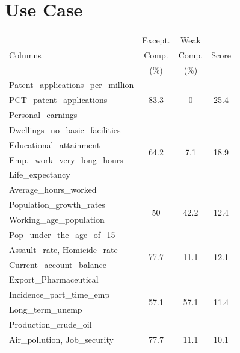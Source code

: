 \section{Use Case}
\label{sec:usecase}

\begin{table}[!t]
    \centering
    \small
    \begin{tabular}{p{4cm} c c c} 
        \hline
        \multirow{3}{*}{Columns}  & Except. & Weak  & \multirow{3}{*}{Score}\\
                                  & Comp.   & Comp.& \\
                                  & (\%)    & (\%)& \\
        \hline
        Patent\_applications\_per\_million & \multirow{3}{*}{83.3}
        &\multirow{3}{*}{0} & \multirow{3}{*}{25.4} \\
        PCT\_patent\_applications&&&\\
        Personal\_earnings &&&\\
        \hline
        Dwellings\_no\_basic\_facilities&
        \multirow{4}{*}{64.2} &\multirow{4}{*}{7.1} & \multirow{4}{*}{18.9} \\
        Educational\_attainment&&&\\
        Emp.\_work\_very\_long\_hours&&&\\
        Life\_expectancy&&&\\
        \hline
        Average\_hours\_worked&
        \multirow{4}{*}{50} &\multirow{4}{*}{42.2} & \multirow{4}{*}{12.4} \\
        Population\_growth\_rates&&&\\ 
        Working\_age\_population&&&\\
        Pop\_under\_the\_age\_of\_15&&&\\
        \hline
        Assault\_rate, Homicide\_rate &
        \multirow{2}{*}{77.7} &\multirow{2}{*}{11.1} & \multirow{2}{*}{12.1} \\
        Current\_\-account\_balance&&&\\
        \hline
        Export\_Pharmaceutical&
        \multirow{4}{*}{57.1} &\multirow{4}{*}{57.1} & \multirow{4}{*}{11.4} \\
        Incidence\_part\_time\_emp&&&\\ 
        Long\_term\_unemp&&&\\ 
        Production\_crude\_oil&&&\\ 
        \hline
        Air\_pollution, Job\_security&
        \multirow{2}{*}{77.7} &\multirow{2}{*}{11.1} & \multirow{2}{*}{10.1} \\

\end{tabular}
\end{table}
